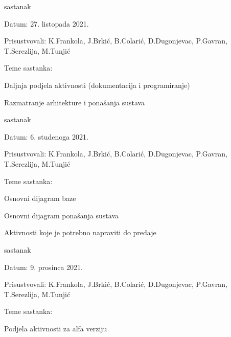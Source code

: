 \begin{packed_enum}
					\item  sastanak
		\item[] \begin{packed_item}
			\item Datum: 27. listopada 2021.
			\item Prisustvovali: K.Frankola, J.Brkić, B.Colarić, D.Dugonjevac, P.Gavran, T.Serezlija, M.Tunjić
			\item Teme sastanka:
			\begin{packed_item}
				\item  Daljnja podjela aktivnosti (dokumentacija i programiranje)
				\item  Razmatranje arhitekture i ponašanja sustava
			\end{packed_item}
		\end{packed_item}
	
						\item  sastanak
	\item[] \begin{packed_item}
		\item Datum: 6. studenoga 2021.
		\item Prisustvovali: K.Frankola, J.Brkić, B.Colarić, D.Dugonjevac, P.Gavran, T.Serezlija, M.Tunjić
		\item Teme sastanka:
		\begin{packed_item}
			\item  Osnovni dijagram baze
			\item  Osnovni dijagram ponašanja sustava
			\item  Aktivnosti koje je potrebno napraviti do predaje
		\end{packed_item}
	\end{packed_item}

						\item  sastanak
\item[] \begin{packed_item}
	\item Datum: 9. prosinca 2021.
	\item Prisustvovali: K.Frankola, J.Brkić, B.Colarić, D.Dugonjevac, P.Gavran, T.Serezlija, M.Tunjić
	\item Teme sastanka:
	\begin{packed_item}
		\item  Podjela aktivnosti za alfa verziju
	\end{packed_item}
\end{packed_item}


\end{packed_enum}

